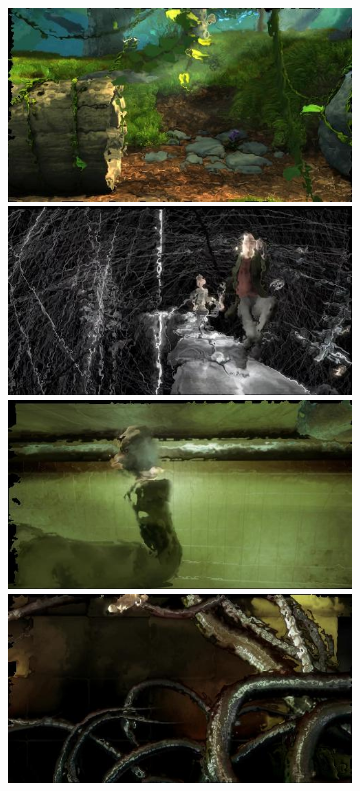 \begin{figure}
\begin{subfigure}[t]{0.135\textwidth}
		\includegraphics[width=\textwidth]{figures/stereo/bbb_frame-0353-11}\\
		\includegraphics[width=\textwidth]{figures/stereo/ed_frame-0097-11}\\
		\includegraphics[width=\textwidth]{figures/stereo/ed_frame-0438-11}\\
		\includegraphics[width=\textwidth]{figures/stereo/ed_frame-0528-11}

\end{subfigure}
\end{figure}
